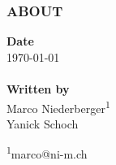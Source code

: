 \null
\vfill
\subsubsection*{ABOUT}

\begin{table}[ht]
    \textbf{Date}                            \\
    \today                                   \\
                                             \\
    \textbf{Written by}                      \\
    Marco Niederberger\textsuperscript{1}    \\
    Yanick Schoch                            \\
\end{table}

{
\footnotesize
\textsuperscript{1}marco@ni-m.ch
}

